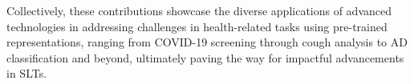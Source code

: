 Collectively, these contributions showcase the diverse applications of advanced technologies in addressing challenges in health-related tasks using pre-trained representations, ranging from COVID-19 screening through cough analysis to \ac{AD} classification and beyond, ultimately paving the way for impactful advancements in \acp{SLT}. 